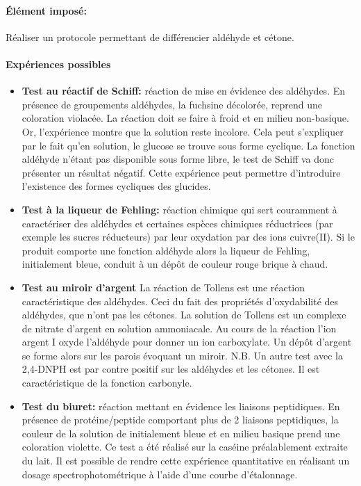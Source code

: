 \documentclass[11pt]{report}
\numberwithin{figure}{section}
\numberwithin{equation}{section}
\numberwithin{table}{section}
\newcommand{\1}{\boldsymbol{1}}
\begin{document}
\paragraph*{Élément imposé:} Réaliser un protocole permettant de différencier aldéhyde et cétone.

\paragraph{Expériences possibles}
\begin{itemize}
\item \textbf{Test au réactif de Schiff:} réaction de mise en évidence des aldéhydes. En présence de groupements aldéhydes, la fuchsine décolorée, reprend une coloration violacée. La réaction doit se faire à froid et en milieu non-basique. Or, l’expérience montre que la solution reste incolore. Cela peut s’expliquer par le fait qu’en solution, le glucose se trouve sous forme cyclique. La fonction aldéhyde n’étant pas
disponible sous forme libre, le test de Schiff va donc présenter un résultat négatif. Cette expérience peut permettre d’introduire l’existence des formes cycliques des glucides.
\item \textbf{Test à la liqueur de Fehling:}  réaction chimique qui sert couramment à caractériser des aldéhydes et certaines espèces chimiques réductrices (par exemple les sucres réducteurs) par leur oxydation par des ions cuivre(II). Si le produit comporte une fonction aldéhyde alors la liqueur de Fehling, initialement bleue, conduit à un dépôt de couleur rouge brique à chaud.
\item \textbf{Test au miroir d'argent} La réaction de Tollens est une réaction caractéristique des aldéhydes. Ceci du fait des propriétés d'oxydabilité des aldéhydes, que n'ont pas les cétones. La solution de Tollens est un complexe de nitrate d'argent en solution ammoniacale. Au cours de la réaction l'ion argent I oxyde l'aldéhyde pour donner un ion carboxylate. Un dépôt d’argent se forme alors sur les parois évoquant un miroir. N.B. Un autre test avec la 2,4-DNPH est par contre positif sur les aldéhydes et les cétones. Il est caractéristique de la fonction carbonyle.
\item \textbf{Test du biuret:}  réaction mettant en évidence les liaisons peptidiques. En présence de protéine/peptide comportant plus de 2 liaisons peptidiques, la couleur
de la solution de  initialement bleue et en milieu basique prend une coloration violette. Ce test a été réalisé sur la caséine préalablement extraite du lait. Il est possible de rendre cette expérience quantitative en réalisant un dosage spectrophotométrique à l’aide d’une courbe d’étalonnage. 

\end{itemize}
\end{document}
